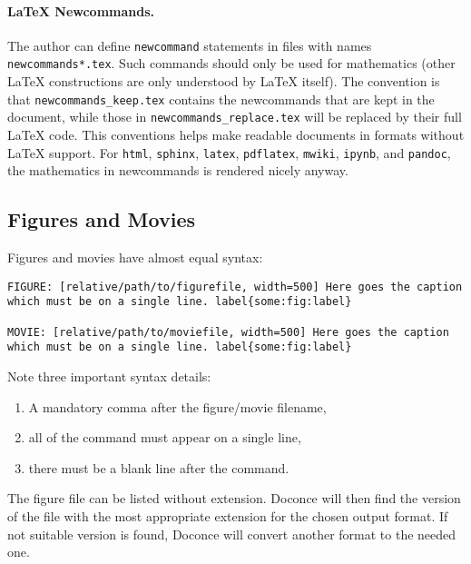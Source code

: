 \documentclass[%
oneside,                 %
final,                   %
10pt]{article}
\begin{document}
\paragraph{LaTeX Newcommands.}
The author can define \Verb!newcommand! statements in files with names
\Verb!newcommands*.tex!. Such commands should only be used for mathematics
(other {\LaTeX} constructions are only understood by {\LaTeX} itself).
The convention is that \Verb!newcommands_keep.tex!
contains the newcommands that are kept in the document, while
those in \Verb!newcommands_replace.tex! will be replaced by their full
{\LaTeX} code. This conventions helps make readable documents in formats
without {\LaTeX} support. For \Verb!html!, \Verb!sphinx!, \Verb!latex!, \Verb!pdflatex!,
\Verb!mwiki!, \Verb!ipynb!, and \Verb!pandoc!, the mathematics in newcommands is
rendered nicely anyway.


\subsection{Figures and Movies}

Figures and movies have almost equal syntax:
\begin{Verbatim}[numbers=none,fontsize=\fontsize{9pt}{9pt},baselinestretch=0.85,xleftmargin=0mm]
FIGURE: [relative/path/to/figurefile, width=500] Here goes the caption which must be on a single line. label{some:fig:label}

MOVIE: [relative/path/to/moviefile, width=500] Here goes the caption which must be on a single line. label{some:fig:label}

\end{Verbatim}
Note three important syntax details:

\begin{enumerate}
 \item A mandatory comma after the figure/movie filename,

 \item all of the command must appear on a single line,

 \item there must be a blank line after the command.
\end{enumerate}

\noindent
The figure file can be listed without extension. Doconce will then find
the version of the file with the most appropriate extension for the chosen
output format. If not suitable version is found, Doconce will convert
another format to the needed one.
\end{document}
